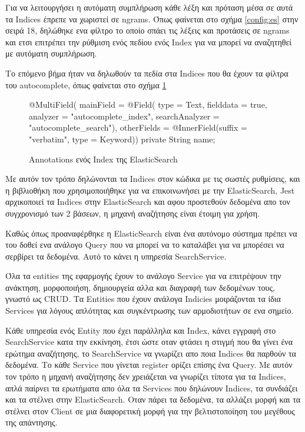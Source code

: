 Για να λειτουργήσει η αυτόματη συμπλήρωση κάθε λέξη και πρόταση μέσα σε αυτά τα Indices έπρεπε να χωριστεί σε ngrams. Όπως φαίνεται στο σχήμα \ref{config:es} στην σειρά 18, δηλώθηκε ενα φίλτρο το οποίο σπάει τις λέξεις και προτάσεις σε ngrams και ετσι επιτρέπει την ρύθμιση ενός πεδίου ενός Index για να μπορεί να αναζητηθεί με αυτόματη συμπλήρωση.

Το επόμενο βήμα ήταν να δηλωθούν τα πεδία στα Indices που θα έχουν τα φίλτρα του autocomplete, όπως φαίνεται στο σχήμα \ref{code:index}

\begin{figure}[h]
    \begin{javacode}
@MultiField(
    mainField = @Field(
        type = Text, 
        fielddata = true,
        analyzer = "autocomplete_index", 
        searchAnalyzer = "autocomplete_search"),
    otherFields = {@InnerField(suffix = "verbatim", type = Keyword)})
private String name;
    \end{javacode}
    \caption{Annotations ενός Index της ElasticSearch}
   \label{code:index}
\end{figure}

Με αυτόν τον τρόπο δηλώνονται τα Indices στον κώδικα με τις σωστές ρυθμίσεις, και η βιβλιοθήκη που χρησιμοποιήθηκε για να επικοινωνήσει με την ElasticSearch, Jest αρχικοποιεί τα Indices στην ElasticSearch και αφου προστεθούν δεδομένα απο τον συγχρονισμό των 2 βάσεων, η μηχανή αναζήτησης είναι έτοιμη για χρήση.

Καθώς όπως προαναφέρθηκε η ElasticSearch είναι ένα αυτόνομο σύστημα πρέπει να του δοθεί ενα ανάλογο Query που να μπορεί να το καταλάβει για να μπορέσει να σερβίρει τα δεδομένα. Αυτό το κάνει η υπηρεσία SearchService.

Όλα τα entities της εφαρμογής έχουν το ανάλογο Service για να επιτρέψουν την ανάκτηση, μορφοποιήση, δημιουργεία αλλα και διαγραφή των δεδομένων τους, γνωστό ως CRUD. Τα Entities που έχουν ανάλογα Indicies μοιράζονται τα ίδια Services για λόγους απλότητας και συγκέντρωσης των αρμοδιοτήτων σε ενα σημείο. 

Κάθε υπηρεσία ενός Entity που έχει παράλληλα και Index, κάνει εγγραφή στο SearchService κατα την εκκίνηση, έτσι ώστε οταν φτάσει η στιγμή που θα γίνει ένα ερώτημα αναζήτησης, το SearchService να γνωρίζει απο ποια Indices θα παρθούν τα δεδομένα. Το κάθε Service που γίνεται register ορίζει επίσης ένα Query. Με αυτόν τον τρόπο η μηχανή αναζήτησης δεν χρειάζεται να γνωρίζει τίποτα για τα Indices, απλά παίρνει τα ερωτήματα απο όλα τα Services που δηλώνουν Indices, τα συνδιάζει και τα στέλνει στην ElasticSearch. Οταν πάρει τα δεδομένα, τα αλλάζει μορφή και τα στέλνει στον Client σε μια διαφορετική μορφή για την βελτιστοποίηση του μεγέθους της απάντησης. 

